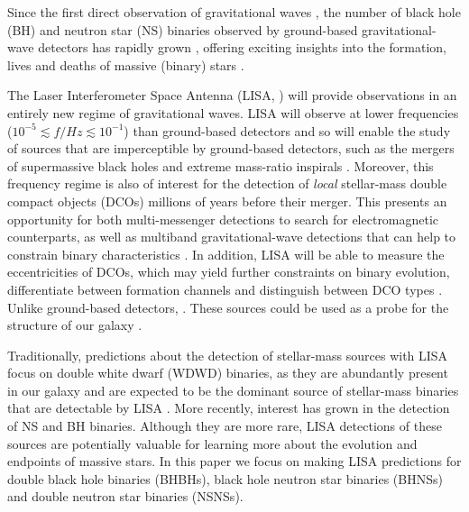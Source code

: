 Since the first direct observation of gravitational waves \citep{Abbott+2016_first_detection}, the number of black hole (BH) and neutron star (NS) binaries observed by ground-based gravitational-wave detectors has rapidly grown \citep{Abbott+2019_GWTC1,Abbott+2020_GWTC2,Abbott+2021_GWTC3}, offering exciting insights into the formation, lives and deaths of massive (binary) stars \citep[e.g.][]{Abbott+2021_GWTC2_inference}.

The Laser Interferometer Space Antenna (LISA, \citealp{Amaro-Seoane+2017, Colpi+2019}) will provide observations in an entirely new regime of gravitational waves. LISA will observe at lower frequencies ($10^{-5} \lesssim f / \unit{Hz} \lesssim 10^{-1}$) than ground-based detectors and so will enable the study of sources that are imperceptible by ground-based detectors, such as the mergers of supermassive black holes and extreme mass-ratio inspirals \citep[e.g.][]{Begelman+1980, Klein+2016}. Moreover, this frequency regime is also of interest for the detection of \textit{local} stellar-mass double compact objects (DCOs) millions of years before their merger. This presents an opportunity for both multi-messenger detections to search for electromagnetic counterparts, as well as multiband gravitational-wave detections that can help to constrain binary characteristics \citep[e.g.][]{Sesana+2016, Gerosa+2019}. In addition, LISA will be able to measure the eccentricities of DCOs, which may yield further constraints on binary evolution, differentiate between formation channels and distinguish between DCO types \citep[e.g.][]{Nelemans+2001, Breivik+2016, Antonini+2017, Rodriguez+2018}. Unlike ground-based detectors, . These sources could be used as a probe for the structure of our galaxy \citep[e.g.][]{Korol+2019}.

Traditionally, predictions about the detection of stellar-mass sources with LISA focus on double white dwarf (WDWD) binaries, as they are abundantly present in our galaxy and are expected to be the dominant source of stellar-mass binaries that are detectable by LISA \citep{Nelemans+2001,Ruiter+2010,Yu+2010,Nissanke+2012,Korol+2017,Lamberts+2018}. More recently, interest has grown in the detection of NS and BH binaries. Although they are more rare, LISA detections of these sources are potentially valuable for learning more about the evolution and endpoints of massive stars. In this paper we focus on making LISA predictions for double black hole binaries (BHBHs), black hole neutron star binaries (BHNSs) and double neutron star binaries (NSNSs).

